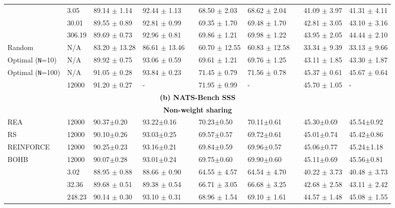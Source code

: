 \documentclass{article}
\begin{document}
\begin{table*}[!h]
\begin{adjustbox}{width=2\columnwidth,center}
\begin{tabular}{@{}llllcllcll@{}}
\color{Sepia}{NASWOT (\texttt{N}=10)}  &     3.05 &  89.14 $\pm$ 1.14 &  92.44 $\pm$ 1.13 &&  68.50 $\pm$ 2.03 &  68.62 $\pm$ 2.04  && 41.09 $\pm$ 3.97 &  41.31 $\pm$ 4.11  \\
\color{Sepia}{NASWOT (\texttt{N}=100)}  &     30.01 &  89.55 $\pm$ 0.89 &  92.81 $\pm$ 0.99 &&  69.35 $\pm$ 1.70 &  69.48 $\pm$ 1.70  && 42.81 $\pm$ 3.05 &  43.10 $\pm$ 3.16  \\
\color{Sepia}{NASWOT (\texttt{N}=1000)}  &     306.19 &  89.69 $\pm$ 0.73 &  92.96 $\pm$ 0.81 &&  69.86 $\pm$ 1.21 &  69.98 $\pm$ 1.22  && 43.95 $\pm$ 2.05 &  44.44 $\pm$ 2.10  \\
\midrule
Random & N/A & 83.20 $\pm$ 13.28 & 86.61 $\pm$ 13.46 && 60.70 $\pm$ 12.55 & 60.83 $\pm$ 12.58 && 33.34 $\pm$ 9.39 & 33.13 $\pm$ 9.66 \\ 
Optimal (\texttt{N}=10) & N/A & 89.92 $\pm$ 0.75 & 93.06 $\pm$ 0.59 && 69.61 $\pm$ 1.21 & 69.76 $\pm$ 1.25 && 43.11 $\pm$ 1.85 & 43.30 $\pm$ 1.87 \\
Optimal (\texttt{N}=100) & N/A & 91.05 $\pm$ 0.28 & 93.84 $\pm$ 0.23 && 71.45 $\pm$ 0.79 & 71.56 $\pm$ 0.78 && 45.37 $\pm$ 0.61 & 45.67 $\pm$ 0.64 \\ 
\midrule
\color{Sepia}{AREA}  & 12000 & 91.20 $\pm$ 0.27 & -  && 71.95 $\pm$ 0.99 &  -  && 45.70  $\pm$ 1.05 & - \\
\midrule
\multicolumn{10}{c}{\textbf{(b) NATS-Bench SSS}}
\\
\midrule
\multicolumn{10}{c}{\textbf{Non-weight sharing}}\\
REA       &  12000 & 90.37$\pm$0.20 & 93.22$\pm$0.16 && 70.23$\pm$0.50 & 70.11$\pm$0.61 && 45.30$\pm$0.69 & 45.54$\pm$0.92 \\
RS        &  12000 & 90.10$\pm$0.26 & 93.03$\pm$0.25 && 69.57$\pm$0.57 & 69.72$\pm$0.61 && 45.01$\pm$0.74 & 45.42$\pm$0.86 \\
REINFORCE &  12000 & 90.25$\pm$0.23 & 93.16$\pm$0.21 && 69.84$\pm$0.59 & 69.96$\pm$0.57 && 45.06$\pm$0.77 & 45.24$\pm$1.18 \\
BOHB      &  12000 & 90.07$\pm$0.28 & 93.01$\pm$0.24 && 69.75$\pm$0.60 & 69.90$\pm$0.60 && 45.11$\pm$0.69 & 45.56$\pm$0.81 \\
\midrule
\color{Sepia}{NASWOT (\texttt{N}=10)}  &     3.02  &  88.95 $\pm$ 0.88 &  88.66 $\pm$ 0.90 &&  64.55 $\pm$ 4.57 &  64.54 $\pm$ 4.70  && 40.22 $\pm$ 3.73 &  40.48 $\pm$ 3.73  \\
\color{Sepia}{NASWOT (\texttt{N}=100)}  &     32.36  &  89.68 $\pm$ 0.51 &  89.38 $\pm$ 0.54 &&  66.71 $\pm$ 3.05 &  66.68 $\pm$ 3.25  && 42.68 $\pm$ 2.58 &  43.11 $\pm$ 2.42  \\
\color{Sepia}{NASWOT (\texttt{N}=1000)} &          248.23 &  90.14 $\pm$ 0.30  & 93.10 $\pm$ 0.31  &&   68.96 $\pm$ 1.54 &  69.10 $\pm$ 1.61  && 44.57 $\pm$ 1.48 &  45.08 $\pm$ 1.55  \\
\midrule
\end{tabular}
\end{adjustbox}

\end{table*}
\end{document}
